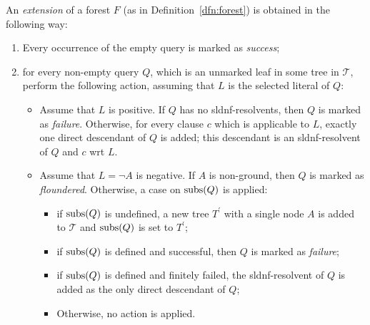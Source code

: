 \begin{dfn}[Extensions]
    An \emph{extension} of a forest \(F\) (as in Definition~\ref{dfn:forest}) is obtained in the following way:
    \begin{enumerate}
        \item Every occurrence of the empty query is marked as \emph{success};
        \item for every non-empty query \(Q\), which is an unmarked leaf in some tree in \(\mathcal{T}\), perform the following action, assuming that \(L\) is the selected literal of \(Q\):
        \begin{itemize}
            \item Assume that \(L\) is positive.
            If \(Q\) has no \gls{sldnf}-resolvents, then \(Q\) is marked as \emph{failure}.
            Otherwise, for every clause \(c\) which is applicable to \(L\), exactly one direct descendant of \(Q\) is added; this descendant is an \gls{sldnf}-resolvent of \(Q\) and \(c\) wrt \(L\).
            \item Assume that \(L = \neg A\) is negative.
            If \(A\) is non-ground, then \(Q\) is marked as \emph{floundered}.
            Otherwise, a case on \(\operatorname{subs}(Q)\) is applied:
            \begin{itemize}
                \item if \(\operatorname{subs}(Q)\) is undefined, a new tree \(T^\prime\) with a single node \(A\) is added to \(\mathcal{T}\) and \(\operatorname{subs}(Q)\) is set to \(T^\prime\);
                \item if \(\operatorname{subs}(Q)\) is defined and successful, then \(Q\) is marked as \emph{failure};
                \item if \(\operatorname{subs}(Q)\) is defined and finitely failed, the \gls{sldnf}-resolvent of \(Q\) is added as the only direct descendant of \(Q\);
                \item Otherwise, no action is applied.
            \end{itemize} 
        \end{itemize}
    \end{enumerate}
\end{dfn}